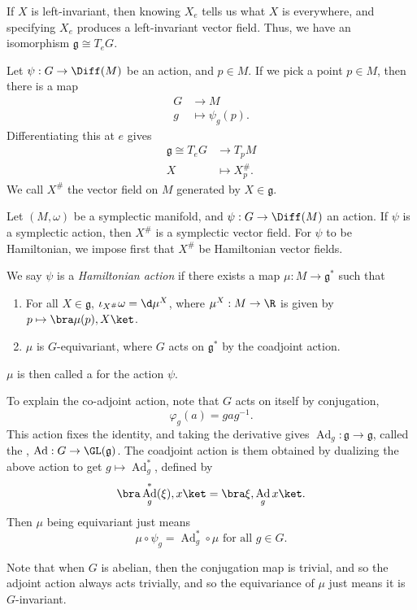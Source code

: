 \documentclass[a4paper]{article}
\DeclareMathOperator{\Ad}{Ad}
\begin{document}
If $X$ is left-invariant, then knowing $X_e$ tells us what $X$ is everywhere, and specifying $X_e$ produces a left-invariant vector field. Thus, we have an isomorphism $\mathfrak{g} \cong T_e G$.

Let $\psi: G \to \Diff(M)$ be an action, and $p \in M$. If we pick a point $p \in M$, then there is a map
\begin{align*}
  G &\to M\\
  g &\mapsto \psi_g(p).
\end{align*}
Differentiating this at $e$ gives
\begin{align*}
  \mathfrak{g} \cong T_e G &\to T_p M\\
  X &\mapsto X_p^\#.
\end{align*}
We call $X^\#$ the vector field on $M$ generated by $X \in \mathfrak{g}$.

Let $(M, \omega)$ be a symplectic manifold, and $\psi: G \to \Diff(M)$ an action. If $\psi$ is a symplectic action, then $X^\#$ is a symplectic vector field. For $\psi$ to be Hamiltonian, we impose first that $X^\#$ be Hamiltonian vector fields.

\begin{defi}
  We say $\psi$ is a \emph{Hamiltonian action} if there exists a map $\mu: M \to \mathfrak{g}^*$ such that
  \begin{enumerate}
    \item For all $X \in \mathfrak{g}$, $\iota_{X^\#} \omega = \d \mu^X$, where $\mu^X: M \to \R$ is given by $p \mapsto \bra \mu(p), X\ket$.
    \item $\mu$ is $G$-equivariant, where $G$ acts on $\mathfrak{g}^*$ by the coadjoint action.
  \end{enumerate}
  $\mu$ is then called a  for the action $\psi$.
\end{defi}
To explain the co-adjoint action, note that $G$ acts on itself by conjugation,
\[
  \varphi_g(a) = gag^{-1}.
\]
This action fixes the identity, and taking the derivative gives $\Ad_g : \mathfrak{g} \to \mathfrak{g}$, called the , $\Ad: G \to \GL(\mathfrak{g})$.
The coadjoint action is them obtained by dualizing the above action to get $g \mapsto \Ad_g^*$, defined by
\[
  \bra \Ad_g^* (\xi), x\ket = \bra \xi, \Ad_g x\ket.
\]
Then $\mu$ being equivariant just means
\[
  \mu \circ \psi_g = \Ad_g^* \circ \mu\text{ for all }g \in G.
\]

Note that when $G$ is abelian, then the conjugation map is trivial, and so the adjoint action always acts trivially, and so the equivariance of $\mu$ just means it is $G$-invariant.
\end{document}
